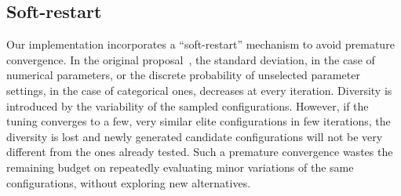 \documentclass[article,a4paper,nojss,notitle]{jss}
\newcommand{\iter}{\ensuremath{j}\xspace}
\newcommand{\Budget}{\ensuremath{B}\xspace}
\newcommand{\Budgetj}{\ensuremath{\Budget_{\iter}}\xspace}
\newcommand{\Bused}{\ensuremath{\Budget_\text{used}}\xspace}
\newcommand{\Niter}{\ensuremath{N^\text{iter}}\xspace}
\newcommand{\tEstimate}{\ensuremath{\hat{t}}\xspace}
\newcommand{\IFRACE}{\text{I/F-Race}\xspace}
\begin{document}




\subsection{Soft-restart}

Our implementation incorporates a ``soft-restart'' mechanism to avoid
premature convergence. In the original \IFRACE
proposal~\citep{BalBirStu07}, the standard deviation, in the case of
numerical parameters, or the discrete probability of unselected
parameter settings, in the case of categorical ones, decreases at
every iteration. Diversity is introduced by the variability of the
sampled configurations. However, if the tuning converges to a few, very
similar elite configurations in few iterations, the diversity is lost
and newly generated candidate configurations will not be very
different from the ones already tested. Such a premature convergence
wastes the remaining budget on repeatedly evaluating minor variations
of the same configurations, without exploring new alternatives.
\end{document}
